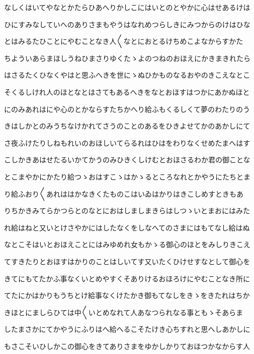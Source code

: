 \documentclass[a4paper,11pt,landscape]{ltjtarticle}
\begin{document}
\par\medskip
なしくはいてやなとかたらひあへりかしこにはいとのとやかに心はせあるけは
\par\medskip
ひにすみなしていへのありさまもやうはなれめつらしきにみつからのけはひな
\par\medskip
とはみるたひことにやむことなき人〱なとにおとるけちめこよなからすかた
\par\medskip
ちよういあらまほしうねひまさりゆくたゝよのつねのおほえにかきまきれたら
\par\medskip
はさるたくひなくやはと思ふへきを世にゝぬひかものなるおやのきこえなとこ
\par\medskip
そくるしけれ人のほとなとはさてもあるへきをなとおほすはつかにあかぬほと
\par\medskip
にのみあれはにや心のとかならすたちかへり給ふもくるしくて夢のわたりのう
\par\medskip
きはしかとのみうちなけかれてさうのことのあるをひきよせてかのあかしにて
\par\medskip
さ夜ふけたりしねもれいのおほしいてらるれはひはをわりなくせめたまへはす
\par\medskip
こしかきあはせたるいかてかうのみひきくしけむとおほさるわか君の御ことな
\par\medskip
とこまやかにかたり給つゝおはすこゝはかゝるところなれとかやうにたちとま
\par\medskip
り給ふおり〱あれははかなきくたものこはいゐはかりはきこしめすときもあ
\par\medskip
りちかきみてらかつらとのなとにおはしましまきらはしつゝいとまおにはみた
\par\medskip
れ給はねと又いとけさやかにはしたなくをしなへてのさまにはもてなし給はぬ
\par\medskip
なとこそはいとおほえことにはみゆめれ女もかゝる御心のほとをみしりきこえ
\par\medskip
てすきたりとおほすはかりのことはしいてす又いたくひけせすなとして御心を
\par\medskip
きてにもてたかふ事なくいとめやすくそありけるおほろけにやむことなき所に
\par\medskip
てたにかはかりもうちとけ給事なくけたかき御もてなしをきゝをきたれはちか
\par\medskip
きほとにましらひては中〱いとめなれて人あなつられなる事ともゝそあらま
\par\medskip
したまさかにてかやうにふりはへ給へるこそたけき心ちすれと思へしあかしに
\par\medskip
もさこそいひしかこの御心をきてありさまをゆかしかりておほつかなからす人
\par\medskip
\end{document}
